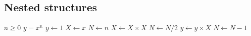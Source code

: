 \documentclass{amsart}
\begin{document}
\subsection{Nested structures}

\begin{algorithmic}
    \Require $n \geq 0$
    \Ensure $y = x^n$
    \State $y \leftarrow 1$
    \State $X \leftarrow x$
    \State $N \leftarrow n$
            \State $X \leftarrow X \times X$
            \State $N \leftarrow N / 2$
        \Else{}
            \State $y \leftarrow y \times X$
            \State $N \leftarrow N - 1$
        \EndIf
    \EndWhile
\end{algorithmic}
\end{document}
